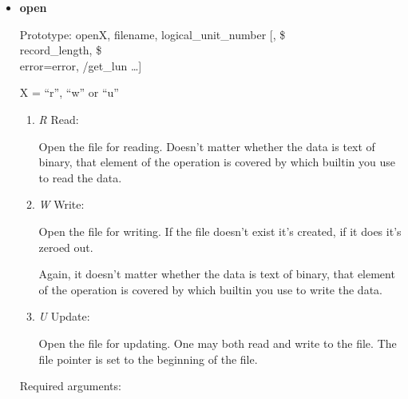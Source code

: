  \begin{itemize}
     \item \textbf{open}

	Prototype: openX, filename, logical\_unit\_number [, \$\\
	   record\_length, \$\\
   	    error=error, /get\_lun \ldots ]

        X = ``r'', ``w'' or ``u''

	\begin{enumerate}
	  \item \textit{R} Read:

	     Open the file for reading. Doesn't matter whether the
             data is text of binary, that element of the operation is
             covered  by which builtin you use to read the data.


	  \item \textit{W} Write:

	     Open the file for writing. If the file doesn't exist
             it's created, if it does it's zeroed out. 

             Again, it doesn't matter whether the data is text of
             binary, that element of the operation is covered by which
             builtin you use to write the data.

	  \item \textit{U} Update: 

	     Open the file for updating. One may both read and write
             to the file. The file pointer is set to the beginning of
             the file.

	\end{enumerate}

	Required arguments:

\end{itemize}
